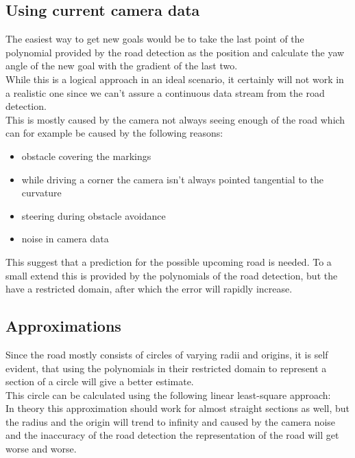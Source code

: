 \subsection{Using current camera data}
The easiest way to get new goals would be to take the last point of the polynomial provided by the road detection as the position and calculate the yaw angle of the new goal with the gradient of the last two.\\

While this is a logical approach in an ideal scenario, it certainly will not work in a realistic one since we can't assure a continuous data stream from the road detection.\\

This is mostly caused by the camera not always seeing enough of the road which can for example be caused by the following reasons:

\begin{itemize}
	\item obstacle covering the markings
	\item while driving a corner the camera isn't always pointed tangential to the curvature
	\item steering during obstacle avoidance
	\item noise in camera data
\end{itemize}


This suggest that a prediction for the possible upcoming road is needed. To a small extend this is provided by the polynomials of the road detection, but the have a restricted domain, after which the error will rapidly increase.

\subsection{Approximations}

Since the road mostly consists of circles of varying radii and origins, it is self evident, that using the polynomials in their restricted domain to represent a section of a circle will give a better estimate.\\
This circle can be calculated using the following linear least-square approach:\\

In theory this approximation should work for almost straight sections as well, but the radius and the origin will trend to infinity and caused by the camera noise and the inaccuracy of the road detection the representation of the road will get worse and worse.\\

